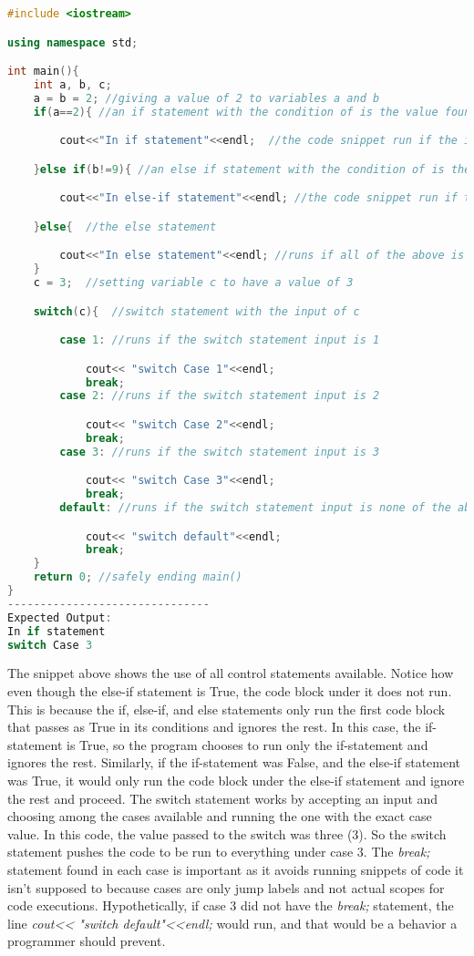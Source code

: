 \documentclass[12pt]{article}
\begin{document}
\begin{lstlisting}[language=C++]
#include <iostream>

using namespace std;

int main(){
    int a, b, c;
    a = b = 2; //giving a value of 2 to variables a and b
    if(a==2){ //an if statement with the condition of is the value found in a equal to 2

        cout<<"In if statement"<<endl;  //the code snippet run if the if statement is true

    }else if(b!=9){ //an else if statement with the condition of is the value found in b not equal to 9

        cout<<"In else-if statement"<<endl; //the code snippet run if the else if statement is true

    }else{  //the else statement

        cout<<"In else statement"<<endl; //runs if all of the above is deteremined to be false
    }
    c = 3;  //setting variable c to have a value of 3

    switch(c){  //switch statement with the input of c

        case 1: //runs if the switch statement input is 1

            cout<< "switch Case 1"<<endl;
            break;
        case 2: //runs if the switch statement input is 2

            cout<< "switch Case 2"<<endl;
            break;
        case 3: //runs if the switch statement input is 3

            cout<< "switch Case 3"<<endl;
            break;
        default: //runs if the switch statement input is none of the above

            cout<< "switch default"<<endl;
            break;
    }
    return 0; //safely ending main()
}
-------------------------------
Expected Output:
In if statement
switch Case 3
\end{lstlisting}
The snippet above shows the use of all control statements available. Notice how even though the else-if statement is True, the code block under it does not run. This is because the if, else-if, and else statements only run the first code block that passes as True in its conditions and ignores the rest. In this case, the if-statement is True, so the program chooses to run only the if-statement and ignores the rest. Similarly, if the if-statement was False, and the else-if statement was True, it would only run the code block under the else-if statement and ignore the rest and proceed. The switch statement works by accepting an input and choosing among the cases available and running the one with the exact case value. In this code, the value passed to the switch was three (3). So the switch statement pushes the code to be run to everything under case 3. The \textit{break;} statement found in each case is important as it avoids running snippets of code it isn't supposed to because cases are only jump labels and not actual scopes for code executions. Hypothetically, if case 3 did not have the \textit{break;} statement, the line \textit{cout<< "switch default"<<endl;} would run, and that would be a behavior a programmer should prevent.
\end{document}

